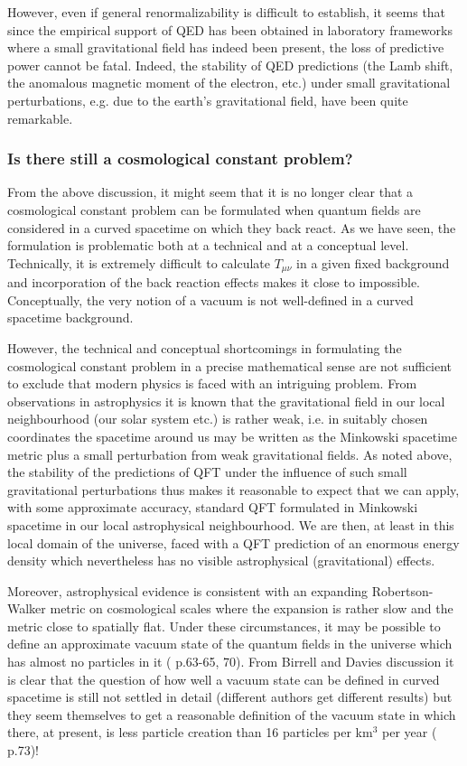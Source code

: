 \documentclass[12pt]{article}
\def\sss{\subsubsection}
\begin{document}
However, even if general renormalizability is difficult to
establish, it seems that since the empirical support of QED has
been obtained in laboratory frameworks where a small gravitational
field has indeed been present, the loss of predictive power cannot
be fatal. Indeed, the stability of QED predictions (the Lamb
shift, the anomalous magnetic moment of the electron, etc.) under
small gravitational perturbations, e.g. due to the earth's gravitational 
field, have been quite remarkable.

\sss{Is there still a cosmological constant problem?}

From the above discussion, it might seem that it is no longer clear
that a cosmological constant problem can be formulated
when quantum fields are considered in a curved spacetime on
which they back react. As we have seen, the formulation
is problematic both at a technical and at a conceptual
level. Technically, it is extremely difficult to calculate
$T_{\mu \nu}$ in a given fixed background and incorporation
of the back reaction effects makes it close to impossible. 
Conceptually, the very notion of a vacuum is not well-defined
in a curved spacetime background. 

However, the technical and conceptual shortcomings in formulating
the cosmological constant problem in a precise mathematical sense
are not sufficient to exclude that modern physics is faced with
an intriguing problem. From observations in astrophysics it is known
that the gravitational field in our local neighbourhood (our solar
system etc.) is rather weak, i.e. in suitably chosen coordinates
the spacetime around us may be written as the Minkowski spacetime
metric plus a small perturbation from weak gravitational fields.
As noted above, the stability of the predictions of QFT under the
influence of such small gravitational perturbations thus makes it
reasonable to expect that we can apply, with some approximate
accuracy, standard QFT formulated in Minkowski spacetime in our
local astrophysical neighbourhood. We are then, at least in this
local domain of the universe, faced with a QFT prediction of an
enormous energy density which nevertheless has no visible
astrophysical (gravitational) effects.

Moreover, astrophysical evidence is consistent with an expanding
Robertson-Walker metric on cosmological scales where the expansion
is rather slow and the metric close to spatially flat. Under these
circumstances, it may be possible to define an approximate vacuum
state of the quantum fields in the universe which has almost no
particles in it (\cite{birrell82} p.63-65, 70). From Birrell and
Davies discussion it is clear that the question of how well a
vacuum state can be defined in curved spacetime is still not
settled in detail (different authors get different results) but
they seem themselves to get a reasonable definition of the vacuum
state in which there, at present, is less particle creation than
16 particles per km$^3$ per year (\cite{birrell82} p.73)!
\end{document}
